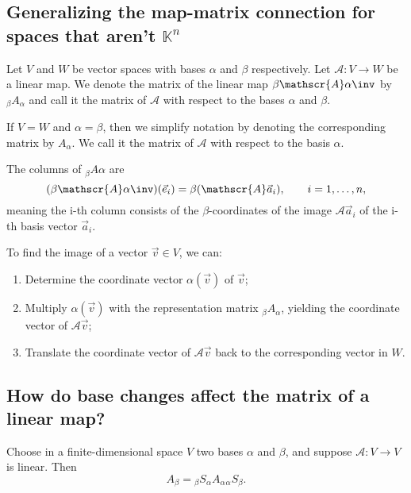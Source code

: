 \subsection{Generalizing the map-matrix connection for spaces that aren't $\mathbb{K}^n$}

\begin{definition}
    Let $V$ and $W$ be vector spaces with bases $\alpha$ and $\beta$ respectively. Let $\mathscr{A}: V \to W$ be a linear map.
    We denote the matrix of the linear map $\beta\mathscr{A}\alpha\inv$ by $_\beta A _\alpha$ and call it the matrix
    of $\mathscr{A}$ with respect to the bases $\alpha$ and $\beta$.
\end{definition}

\begin{remark}
    If $V = W$ and $\alpha = \beta$, then we simplify notation by denoting the corresponding matrix by $A_\alpha$.
    We call it the matrix of $\mathscr{A}$ with respect to the basis $\alpha$.
\end{remark}

\begin{remark}
    The columns of $_\beta A \alpha$ are
    $$(\beta\mathscr{A}\alpha\inv)(\vec{e}_i) = \beta(\mathscr{A}\vec{a}_i), \qquad i = 1,\dots,n,$$
    meaning the i-th column consists of the $\beta$-coordinates of the image $\mathscr{A}\vec{a}_i$ of the i-th basis vector $\vec{a}_i$.
\end{remark}

\begin{remark}
    To find the image of a vector $\vec{v} \in V$, we can:
    \begin{enumerate}
        \item Determine the coordinate vector $\alpha(\vec{v})$ of $\vec{v}$;
        \item Multiply $\alpha(\vec{v})$ with the representation matrix $_\beta A _\alpha$, yielding the coordinate vector
            of $\mathscr{A}\vec{v}$;
        \item Translate the coordinate vector of $\mathscr{A}\vec{v}$ back to the corresponding vector in $W$.
    \end{enumerate}
\end{remark}

\subsection{How do base changes affect the matrix of a linear map?}

\begin{theorem}
    Choose in a finite-dimensional space $V$ two bases $\alpha$ and $\beta$, and suppose $\mathscr{A}: V \to V$ is linear. Then
    $$A_\beta = {_\beta S _\alpha} {A_\alpha} {_\alpha S _\beta}.$$
\end{theorem}

